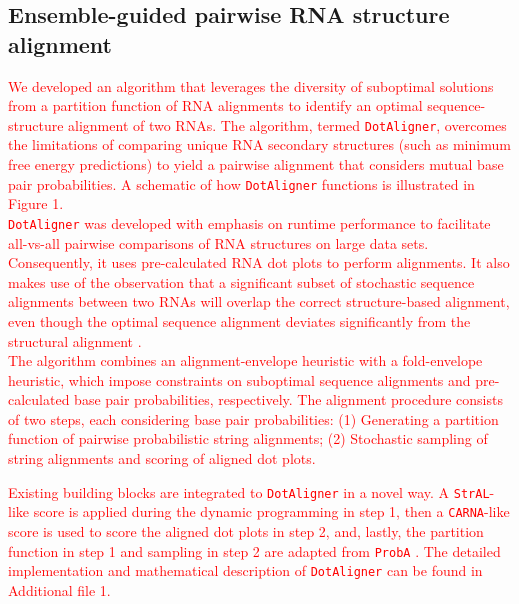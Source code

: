 \documentclass{bmcart}
\newcommand\dotaligner{\texttt{DotAligner}}
\newcommand\carna{\texttt{CARNA}}
\begin{document}
\subsection*{Ensemble-guided pairwise RNA structure alignment} 
 
\textcolor{red}{
We developed an algorithm that leverages the diversity of suboptimal solutions from a partition
function of RNA alignments to identify an optimal sequence-structure alignment
of two RNAs. The algorithm, termed  \dotaligner{}, overcomes the limitations of comparing unique RNA
secondary structures (such as minimum free energy predictions) to yield a
pairwise alignment that considers mutual base pair probabilities. 
A schematic of how \dotaligner{} functions is illustrated in Figure 1.} \\

\textcolor{red}{
\dotaligner{} was developed with emphasis on runtime performance to 
facilitate all-vs-all pairwise comparisons of RNA structures on large data sets. 
Consequently, it uses pre-calculated RNA dot plots to perform alignments. 
It also makes use of the observation that a significant subset of stochastic sequence alignments 
 between two RNAs will overlap the correct structure-based alignment, even though 
 the optimal sequence alignment deviates significantly from the structural alignment \cite{Muckstein12385998}. }\\

\textcolor{red}{
The algorithm combines an alignment-envelope heuristic with a fold-envelope 
heuristic, which impose constraints on suboptimal sequence alignments and  
pre-calculated base pair probabilities, respectively. 
The alignment procedure consists of two steps, each considering base pair probabilities:
(1) Generating a partition function of pairwise probabilistic string alignments; 
(2) Stochastic sampling of string alignments and scoring of aligned dot plots.\\}

\textcolor{red}{
Existing building blocks are integrated to \dotaligner{} in a novel way. 
A \texttt{StrAL}-like score is applied during the dynamic programming in step 1, 
then a \carna-like score is used to score the aligned dot plots in step 2, 
and, lastly, the partition function in step 1 and sampling in step 2 are adapted
from \texttt{ProbA} \cite{Muckstein12385998}. The detailed implementation 
and mathematical description of \dotaligner{} can be found in Additional file 1.\\
}
\end{document}

